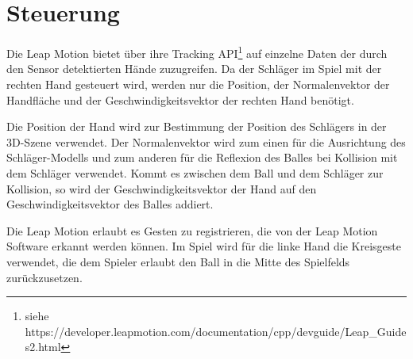 
\chapter{Steuerung}
\label{Kapitel 3}
%
Die Leap Motion bietet über ihre Tracking API\footnote{ siehe https://developer.leapmotion.com/documentation/cpp/devguide/Leap\_Guides2.html} auf einzelne Daten der durch den Sensor detektierten Hände zuzugreifen. Da der Schläger im Spiel mit der rechten Hand gesteuert wird, werden nur die Position, der Normalenvektor der Handfläche und der Geschwindigkeitsvektor der rechten Hand benötigt.

Die Position der Hand wird zur Bestimmung der Position des Schlägers in der 3D-Szene verwendet. Der Normalenvektor wird zum einen für die Ausrichtung des Schläger-Modells und zum anderen für die Reflexion des Balles bei Kollision mit dem Schläger verwendet. Kommt es zwischen dem Ball und dem Schläger zur Kollision, so wird der Geschwindigkeitsvektor der Hand auf den Geschwindigkeitsvektor des Balles addiert.

Die Leap Motion erlaubt es Gesten zu registrieren, die von der Leap Motion Software erkannt werden können. Im Spiel wird für die linke Hand die Kreisgeste verwendet, die dem Spieler erlaubt den Ball in die Mitte des Spielfelds zurückzusetzen.
%
